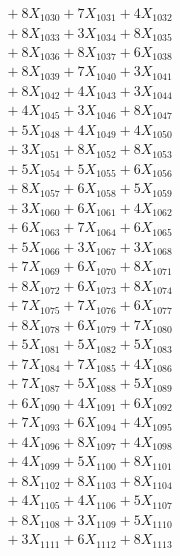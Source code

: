 \documentclass[a4paper,10pt]{article}
\begin{document}
{\begin{align}
&\;  + 8 X_{1030} + 7 X_{1031} + 4 X_{1032} \\[0.3ex]
&\;  + 8 X_{1033} + 3 X_{1034} + 8 X_{1035} \\[0.3ex]
&\;  + 8 X_{1036} + 8 X_{1037} + 6 X_{1038} \\[0.3ex]
&\;  + 8 X_{1039} + 7 X_{1040} + 3 X_{1041} \\[0.3ex]
&\;  + 8 X_{1042} + 4 X_{1043} + 3 X_{1044} \\[0.3ex]
&\;  + 4 X_{1045} + 3 X_{1046} + 8 X_{1047} \\[0.3ex]
&\;  + 5 X_{1048} + 4 X_{1049} + 4 X_{1050} \\[0.3ex]
&\;  + 3 X_{1051} + 8 X_{1052} + 8 X_{1053} \\[0.3ex]
&\;  + 5 X_{1054} + 5 X_{1055} + 6 X_{1056} \\[0.3ex]
&\;  + 8 X_{1057} + 6 X_{1058} + 5 X_{1059} \\[0.5ex]\allowbreak
&\;  + 3 X_{1060} + 6 X_{1061} + 4 X_{1062} \\[0.3ex]
&\;  + 6 X_{1063} + 7 X_{1064} + 6 X_{1065} \\[0.3ex]
&\;  + 5 X_{1066} + 3 X_{1067} + 3 X_{1068} \\[0.3ex]
&\;  + 7 X_{1069} + 6 X_{1070} + 8 X_{1071} \\[0.3ex]
&\;  + 8 X_{1072} + 6 X_{1073} + 8 X_{1074} \\[0.3ex]
&\;  + 7 X_{1075} + 7 X_{1076} + 6 X_{1077} \\[0.3ex]
&\;  + 8 X_{1078} + 6 X_{1079} + 7 X_{1080} \\[0.3ex]
&\;  + 5 X_{1081} + 5 X_{1082} + 5 X_{1083} \\[0.3ex]
&\;  + 7 X_{1084} + 7 X_{1085} + 4 X_{1086} \\[0.3ex]
&\;  + 7 X_{1087} + 5 X_{1088} + 5 X_{1089} \\[0.5ex]\allowbreak
&\;  + 6 X_{1090} + 4 X_{1091} + 6 X_{1092} \\[0.3ex]
&\;  + 7 X_{1093} + 6 X_{1094} + 4 X_{1095} \\[0.3ex]
&\;  + 4 X_{1096} + 8 X_{1097} + 4 X_{1098} \\[0.3ex]
&\;  + 4 X_{1099} + 5 X_{1100} + 8 X_{1101} \\[0.3ex]
&\;  + 8 X_{1102} + 8 X_{1103} + 8 X_{1104} \\[0.3ex]
&\;  + 4 X_{1105} + 4 X_{1106} + 5 X_{1107} \\[0.3ex]
&\;  + 8 X_{1108} + 3 X_{1109} + 5 X_{1110} \\[0.3ex]
&\;  + 3 X_{1111} + 6 X_{1112} + 8 X_{1113} \\[0.3ex]

\end{align}}
\end{document}
